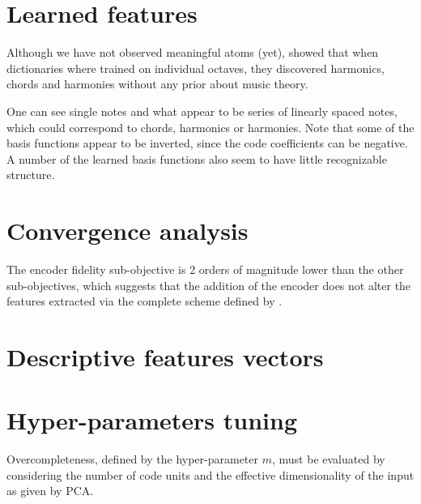 \section{Learned features}

Although we have not observed meaningful atoms (yet), \cite{lecun2010PSD} showed that when dictionaries where trained on individual octaves, they discovered harmonics, chords and harmonies without any prior about music theory.

One can see single notes and what appear to be series of linearly
spaced notes, which could correspond to chords, harmonics
or harmonies. Note that some of the basis functions appear
to be inverted, since the code coefficients can be negative.
A number of the learned basis functions also seem to have
little recognizable structure.


\section{Convergence analysis}

The encoder fidelity sub-objective is 2 orders of magnitude lower than the other sub-objectives, which suggests that the addition of the encoder does not alter the features extracted via the complete scheme defined by .

\section{Descriptive features vectors}

\section{Hyper-parameters tuning}

Overcompleteness, defined by the hyper-parameter $m$, must be evaluated by considering the number of code units and the effective dimensionality of the input as given by \gls{PCA}.

